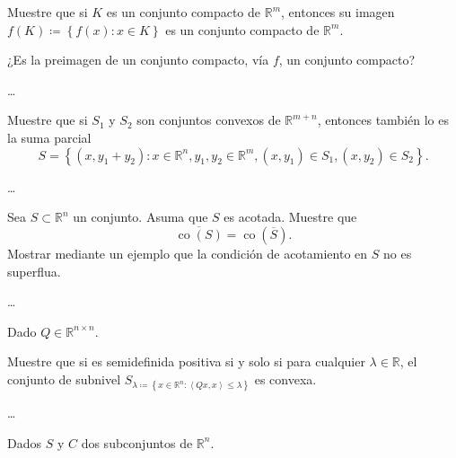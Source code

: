 \documentclass{testfcuni} %
\begin{document}
\begin{questions}
  Muestre que si $K$ es un conjunto compacto de $\mathds{R}^{m}$,
  entonces su imagen
  \begin{math}
    f\left(K\right)\coloneqq
    \left\{
    f\left(x\right)\colon
    x\in K
    \right\}
  \end{math}
  es un conjunto compacto de $\mathds{R}^{m}$.

  ¿Es la preimagen de un conjunto compacto, vía $f$, un conjunto compacto? %

  \begin{solution}
    \ldots
  \end{solution}

  \question

  Muestre que si $S_{1}$ y $S_{2}$ son conjuntos convexos de
  $\mathds{R}^{m+n}$, entonces también lo es la suma parcial
  \[
    S=
    \left\{
    \left(x,y_{1}+y_{2}\right)\colon
    x\in\mathds{R}^{n},y_{1},y_{2}\in\mathds{R}^{m},
    \left(x,y_{1}\right)\in S_{1},
    \left(x,y_{2}\right)\in S_{2}
    \right\}.
  \]

  \begin{solution}
    \ldots
  \end{solution}

  \question

  Sea $S\subset\mathds{R}^{n}$ un conjunto.
  Asuma que $S$ es acotada.
  Muestre que
  \[
    \overline{\operatorname{co}\left(S\right)}=
    \operatorname{co}\left(\overline{S}\right).
  \]
  Mostrar mediante un ejemplo que la condición de acotamiento en
  $S$ no es superflua.

  \begin{solution}
    \ldots
  \end{solution}

  \question

  Dado $Q\in\mathds{R}^{n\times n}$.

  Muestre que si es semidefinida positiva si y solo si para cualquier
  $\lambda\in\mathds{R}$, el conjunto de subnivel
  \begin{math}
    S_{\lambda\coloneqq
    \left\{
    x\in\mathds{R}^{n}\colon
    \left\langle Qx,x\right\rangle\leq
    \lambda
    \right\}
    }
  \end{math}
  es convexa.

  \begin{solution}
    \ldots
  \end{solution}

  \question

  Dados $S$ y $C$ dos subconjuntos de $\mathds{R}^{n}$.


\end{questions}
\end{document}
